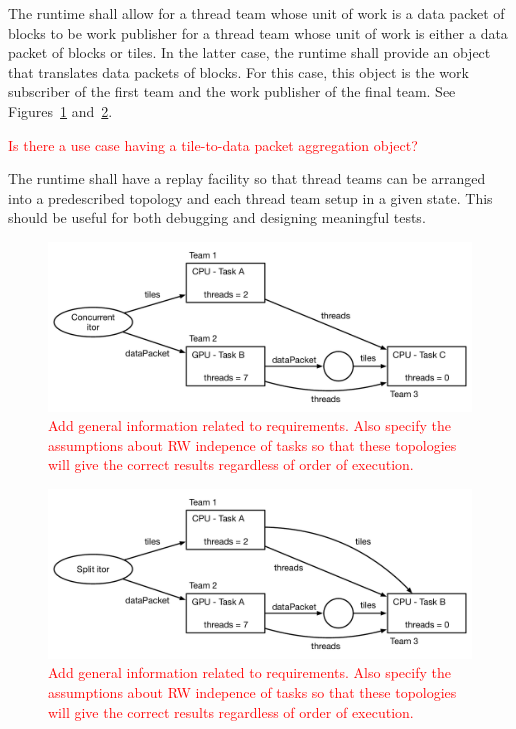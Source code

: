 \documentclass{article}
\begin{document}
\begin{req}
The runtime shall allow for a thread team whose unit of work is a data packet of
blocks to be work publisher for a thread team whose unit of work is either a
data packet of blocks or tiles.  In the latter case, the runtime shall provide
an object that translates data packets of blocks.  For this case, this object is
the work subscriber of the first team and the work publisher of the final team.
See Figures~\ref{fig:ConcurrentItor} and~\ref{fig:SplitItor}.
\end{req}

\textcolor{red}{Is there a use case having a tile-to-data packet aggregation
object?}

\begin{req}
The runtime shall have a replay facility so that thread teams can be arranged
into a predescribed topology and each thread team setup in a given state.  This
should be useful for both debugging and designing meaningful tests.
\end{req}

\begin{figure}[!ht]
\begin{center}
\includegraphics[width=5.0in]{ConcurrentItorExample.pdf}
\caption[]{\textcolor{red}{Add general information related to requirements.
Also specify the assumptions about RW indepence of tasks so that these
topologies will give the correct results regardless of order of execution.}}
\label{fig:ConcurrentItor}
\end{center}
\end{figure}

\begin{figure}[!ht]
\begin{center}
\includegraphics[width=5.0in]{WorkSplittingExample.pdf}
\caption[]{\textcolor{red}{Add general information related to requirements.
Also specify the assumptions about RW indepence of tasks so that these
topologies will give the correct results regardless of order of execution.}}
\label{fig:SplitItor}
\end{center}
\end{figure}
\end{document}
